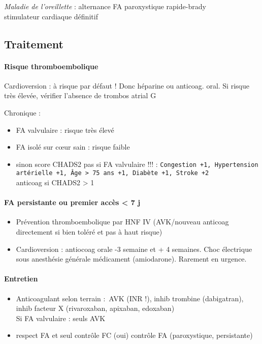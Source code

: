 \documentclass{article}
\begin{document}
\textit{Maladie de l'oreillette}  : alternance FA paroxystique rapide-brady\\
\thus stimulateur cardiaque définitif

\subsection{Traitement}
\paragraph{Risque thromboembolique}
Cardioversion : à risque par défaut ! Donc héparine ou anticoag. oral. 
Si risque très élevée, vérifier l'absence de trombos atrial G

Chronique :
\begin{itemize}
  \item FA valvulaire : risque très élevé
  \item FA isolé sur c\oe{}ur sain : risque faible
  \item sinon score CHADS2 \danger{} pas si FA valvulaire !!! : \texttt{Congestion +1,
    Hypertension artérielle +1, Âge > 75 ans +1, Diabète +1, Stroke +2}\\
    anticoag si CHADS2 > 1
\end{itemize}

\paragraph{FA persistante ou premier accès < 7 j}
\begin{itemize}
  \item Prévention thromboembolique par HNF IV (AVK/nouveau anticoag
    directement si bien toléré et pas à haut risque)
  \item Cardioversion : antiocoag orale -3 semaine et + 4 semaines. Choc
    électrique sous anesthésie générale \lor{} médicament (amiodarone). Rarement en
    urgence.
\end{itemize}

\paragraph{Entretien}
\begin{itemize}
  \item Anticoagulant selon terrain : AVK (INR !), inhib trombine (dabigatran), inhib
facteur X (rivaroxaban, apixaban, edoxaban)\\
Si FA valvulaire : seuls AVK
\item respect FA et seul contrôle FC (oui) \lor{} contrôle FA (paroxystique,
  persistante)
\end{itemize}
\end{document}
